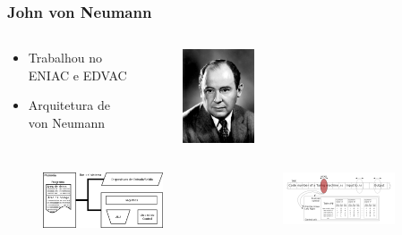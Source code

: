 \documentclass{beamer}
\begin{document}
\begin{frame}
    \frametitle{John von Neumann}
    \begin{columns}
        \begin{column}
            \begin{itemize}
                \item Trabalhou no ENIAC e EDVAC
                \item Arquitetura de von Neumann
            \end{itemize}
        \end{column}
        \begin{column}
            \begin{figure}
                \includegraphics[width = 0.3\textwidth]{figures/von}
            \end{figure}
        \end{column}
    \end{columns}
    \begin{columns}
        \begin{column}
            \begin{figure}
                \includegraphics[width = 0.8\textwidth]{figures/arvon}
            \end{figure}
        \end{column}
        \begin{column}
            \begin{figure}
                \includegraphics[width = 0.8\textwidth]{figures/ut}
            \end{figure}
        \end{column}
    \end{columns}
\end{frame}
\end{document}
